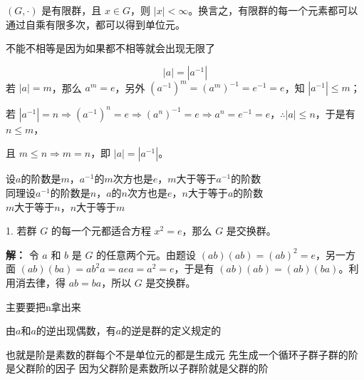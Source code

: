 \begin{proposition}[命题 1.21]
$(G,\cdot)$ 是有限群，且 $x\in G$，则 $|x|<\infty$。换言之，有限群的每一个元素都可以通过自乘有限多次，都可以得到单位元。
\end{proposition}

\begin{note}[有限群每一个元素都有元]
不能不相等是因为如果都不相等就会出现无限了
\end{note}

\begin{proposition}[$a$ 和 $a^{-1}$ 阶数一样]
\[
|a|=|a^{-1}|
\]
若 $|a|=m$，那么 $a^m=e$，另外 $(a^{-1})^m=(a^m)^{-1}=e^{-1}=e$，知 $|a^{-1}|\le m$；

若 $|a^{-1}|=n\Rightarrow(a^{-1})^n=e\Rightarrow(a^n)^{-1}=e\Rightarrow a^n=e^{-1}=e$，$\therefore|a|\le n$，于是有 $n\le m$，

且 $m\le n\Rightarrow m=n$，即 $|a|=|a^{-1}|$。
\end{proposition}

\begin{note}[a和a的逆阶数一样]
设$a$的阶数是$m$，$a^{-1}$的$m$次方也是$e$，$m$大于等于$a^{-1}$的阶数 \\
同理设$a^{-1}$的阶数是$n$，$a$的$n$次方也是$e$，$n$大于等于$a$的阶数 \\
$m$大于等于$n$，$n$大于等于$m$
\end{note}

\begin{example}[阶的例题]
1. 若群 $G$ 的每一个元都适合方程 $x^2=e$，那么 $G$ 是交换群。

\textbf{解：} 令 $a$ 和 $b$ 是 $G$ 的任意两个元。由题设 $(ab)(ab)=(ab)^2=e$，另一方面 $(ab)(ba)=ab^2a=aea=a^2=e$，于是有 $(ab)(ab)=(ab)(ba)$。利用消去律，得 $ab=ba$，所以 $G$ 是交换群。
\end{example}

\begin{note}[命题1 2 6 带余除法和阶n的结合]
主要要把n拿出来
\end{note}

\begin{note}[阶数与奇偶]
由$a$和$a$的逆出现偶数，有$a$的逆是群的定义规定的
\end{note}

\begin{note}[阶是素数的群一定是循环]
也就是阶是素数的群每个不是单位元的都是生成元 先生成一个循环子群子群的阶是父群阶的因子 因为父群阶是素数所以子群阶就是父群的阶
\end{note}

